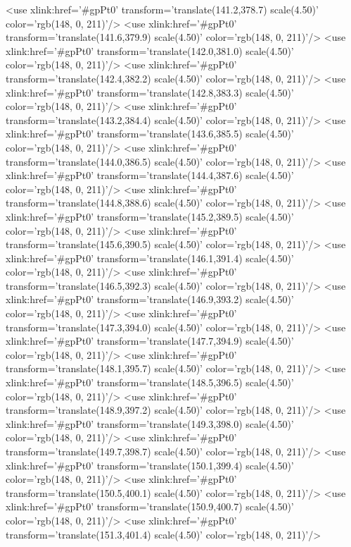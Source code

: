 	<use xlink:href='#gpPt0' transform='translate(141.2,378.7) scale(4.50)' color='rgb(148,   0, 211)'/>
	<use xlink:href='#gpPt0' transform='translate(141.6,379.9) scale(4.50)' color='rgb(148,   0, 211)'/>
	<use xlink:href='#gpPt0' transform='translate(142.0,381.0) scale(4.50)' color='rgb(148,   0, 211)'/>
	<use xlink:href='#gpPt0' transform='translate(142.4,382.2) scale(4.50)' color='rgb(148,   0, 211)'/>
	<use xlink:href='#gpPt0' transform='translate(142.8,383.3) scale(4.50)' color='rgb(148,   0, 211)'/>
	<use xlink:href='#gpPt0' transform='translate(143.2,384.4) scale(4.50)' color='rgb(148,   0, 211)'/>
	<use xlink:href='#gpPt0' transform='translate(143.6,385.5) scale(4.50)' color='rgb(148,   0, 211)'/>
	<use xlink:href='#gpPt0' transform='translate(144.0,386.5) scale(4.50)' color='rgb(148,   0, 211)'/>
	<use xlink:href='#gpPt0' transform='translate(144.4,387.6) scale(4.50)' color='rgb(148,   0, 211)'/>
	<use xlink:href='#gpPt0' transform='translate(144.8,388.6) scale(4.50)' color='rgb(148,   0, 211)'/>
	<use xlink:href='#gpPt0' transform='translate(145.2,389.5) scale(4.50)' color='rgb(148,   0, 211)'/>
	<use xlink:href='#gpPt0' transform='translate(145.6,390.5) scale(4.50)' color='rgb(148,   0, 211)'/>
	<use xlink:href='#gpPt0' transform='translate(146.1,391.4) scale(4.50)' color='rgb(148,   0, 211)'/>
	<use xlink:href='#gpPt0' transform='translate(146.5,392.3) scale(4.50)' color='rgb(148,   0, 211)'/>
	<use xlink:href='#gpPt0' transform='translate(146.9,393.2) scale(4.50)' color='rgb(148,   0, 211)'/>
	<use xlink:href='#gpPt0' transform='translate(147.3,394.0) scale(4.50)' color='rgb(148,   0, 211)'/>
	<use xlink:href='#gpPt0' transform='translate(147.7,394.9) scale(4.50)' color='rgb(148,   0, 211)'/>
	<use xlink:href='#gpPt0' transform='translate(148.1,395.7) scale(4.50)' color='rgb(148,   0, 211)'/>
	<use xlink:href='#gpPt0' transform='translate(148.5,396.5) scale(4.50)' color='rgb(148,   0, 211)'/>
	<use xlink:href='#gpPt0' transform='translate(148.9,397.2) scale(4.50)' color='rgb(148,   0, 211)'/>
	<use xlink:href='#gpPt0' transform='translate(149.3,398.0) scale(4.50)' color='rgb(148,   0, 211)'/>
	<use xlink:href='#gpPt0' transform='translate(149.7,398.7) scale(4.50)' color='rgb(148,   0, 211)'/>
	<use xlink:href='#gpPt0' transform='translate(150.1,399.4) scale(4.50)' color='rgb(148,   0, 211)'/>
	<use xlink:href='#gpPt0' transform='translate(150.5,400.1) scale(4.50)' color='rgb(148,   0, 211)'/>
	<use xlink:href='#gpPt0' transform='translate(150.9,400.7) scale(4.50)' color='rgb(148,   0, 211)'/>
	<use xlink:href='#gpPt0' transform='translate(151.3,401.4) scale(4.50)' color='rgb(148,   0, 211)'/>
